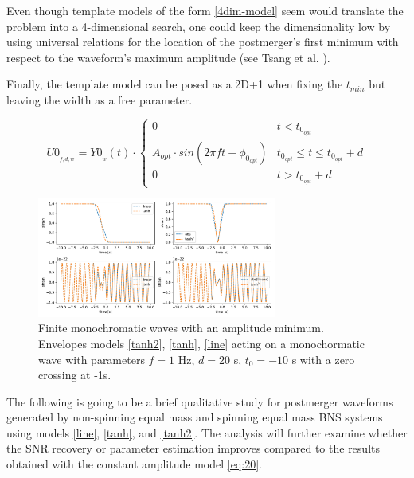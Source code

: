 Even though template models of the form \ref{4dim-model} seem would translate the problem into a 4-dimensional search, one could keep the dimensionality low by using universal relations for the location of the postmerger's first minimum with respect to the waveform's maximum amplitude (see Tsang et al. \cite{Tsang:2019esi}). 

Finally, the template model can be posed as a 2D+1 when fixing the $t_{min}$ but leaving the width as a free parameter.

\begin{equation}\label{3dim-model}
U0_{_{f,d, w}} = Y0_{_{w}}(t) \cdot
\begin{cases} 
      0 & t<t_{0_{opt}} \\
      A_{opt} \cdot sin(2\pi f t + \phi_{0_{opt}}) & t_{0_{opt}} \leq t\leq t_{0_{opt}}+d \\
      0 & t>t_{0_{opt}}+d
   \end{cases}
\end{equation}

\begin{figure}[hbt!]
\begin{center}
\includegraphics[width=0.7\textwidth, angle=0]{images/Data_analysis/results/envel.pdf}
\captionsetup{width=0.8\textwidth}
\caption[Finite monochromatic waves with an amplitude minimum]{Finite monochromatic waves with an amplitude minimum. Envelopes models \ref{tanh2}, \ref{tanh}, \ref{line} acting on a monochormatic wave with parameters $f=1$ Hz, $d=20$ s, $t_{0}=-10$ s with a zero crossing at -1s.}
\label{env.ex}
\end{center}
\end{figure}
\FloatBarrier


The following is going to be a brief qualitative study for postmerger waveforms generated by non-spinning equal mass and spinning equal mass BNS systems using models \ref{line}, \ref{tanh}, and \ref{tanh2}. The analysis will further examine whether the SNR recovery or parameter estimation improves compared to the results obtained with the constant amplitude model \ref{eq:20}.


